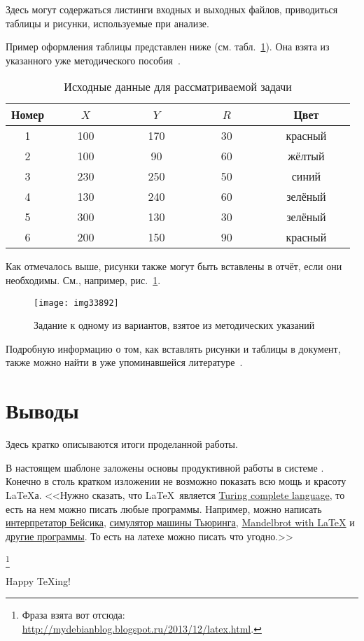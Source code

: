 Здесь могут содержаться листинги входных и выходных файлов, приводиться таблицы и рисунки, используемые при анализе.

Пример оформления таблицы представлен ниже (см. табл.~\ref{tabl:1}). Она взята из указанного уже методического пособия~\cite{gutgut:1}.

\begin{center}
\begin{table}[h!]
\centering
\caption{Исходные данные для рассматриваемой задачи}
\label{tabl:1}
\begin{tabular}{|c|c|c|c|c|}
\hline
Номер &~~~~$X$~~~~ &~~~~$Y$~~~~&~~~~$R$~~~~&~~~~Цвет~~~~\\
\hline
1 &	100  &	170 & 30 & \color{red} красный\\
2 &	100  &	90	& 60 & \color{yellow} жёлтый\\
3 &	230  &	250	& 50 & \color{blue} синий\\
4 &	130  &	240 & 60 & \color{green} зелёный\\
5 & 300  &	130 & 30 & \color{green} зелёный\\
6 &	200  &	150	& 90 & \color{red} красный\\
\hline
\end{tabular}
\end{table}
\end{center}

Как отмечалось выше, рисунки также могут быть вставлены в отчёт, если они необходимы. См., например, рис.~\ref{fig:1}.

\begin{figure}[h!]
\centering
\texttt{[image: img33892]}

\caption{Задание к одному из вариантов, взятое из методических указаний~\cite{gutgut:2}}
\label{fig:1}
\end{figure}

Подробную информацию о том, как вставлять рисунки и таблицы в документ, также можно найти в уже упоминавшейся литературе~\cite{latex:b1,latex:b2,latex:b3}. 

\section{Выводы}
Здесь кратко описываются итоги проделанной работы.

В настоящем шаблоне заложены основы продуктивной работы в системе \LaTeXe.  Конечно в столь кратком изложении не возможно показать всю мощь и красоту \LaTeX{а}. 
<<Нужно сказать, что \LaTeX\ является \href{https://ru.wikipedia.org/wiki/%D0%9F%D0%BE%D0%BB%D0%BD%D0%BE%D1%82%D0%B0_%D0%BF%D0%BE_%D0%A2%D1%8C%D1%8E%D1%80%D0%B8%D0%BD%D0%B3%D1%83}{Turing complete language}, то есть на нем можно писать любые программы. Например, можно написать \href{http://tug.org/TUGboat/tb11-3/tb29greene.pdf}{интерпретатор Бейсика}, \href{http://en.literateprograms.org/Turing_machine_simulator_%28LaTeX%29}{симулятор машины Тьюринга}, 
\href{http://www.thole.org/manfred/apfel/}{Mandelbrot with LaTeX} и \href{http://stackoverflow.com/questions/2968411/ive-heard-that-latex-is-turing-complete-are-there-any-programs-written-in-late}{другие программы}. То есть на латехе можно писать что угодно.>>

\footnote{Фраза взята вот отсюда: \url{http://mydebianblog.blogspot.ru/2013/12/latex.html}.}

\vfill
\centerline{\Huge Happy \TeX{ing}!}
\vfill
